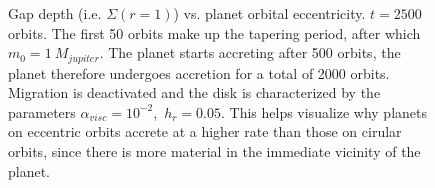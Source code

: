         \begin{figure}[h!]
          \centering
          \begin{minipage}{.5\linewidth}
            \centering
          \end{minipage}%
          \begin{minipage}{.5\linewidth}
            \centering
          \end{minipage}
          \caption{
            Gap depth (i.e. $\Sigma(r=1)$) vs. planet orbital eccentricity.
            $t=2500$ orbits. The first 50 orbits make up the tapering 
            period, after which $m_0=1\ M_{jupiter}$. The planet starts 
            accreting after 500 orbits, the planet therefore undergoes accretion 
            for a total of 2000 orbits. Migration is
            deactivated and the disk is characterized by the parameters 
            $\alpha_{visc}=10^{-2}$,\ $h_r=0.05$.
            This helps visualize why planets on eccentric orbits accrete at a 
            higher rate than those on cirular orbits, since there is more 
            material in the immediate vicinity of the planet.
          }
          \label{fig:gap_depth_vs_e0}
        \end{figure}
%
